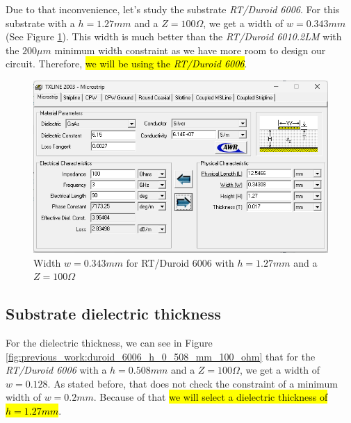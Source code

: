\documentclass[12pt]{report} %
\newcommand{\highlight}[1]{\sethlcolor{yellow}\hl{#1}}
\begin{document}
Due to that inconvenience, let's study the substrate \textit{RT/Duroid 6006}. For this substrate with a $h = 1.27 mm$ and a $Z = 100 \Omega$, we get a width of $w = 0.343 mm$ (See Figure \ref{fig:previous_work:duroid_6006_h_1_27_mm_100_ohm}). This width is much better than the \textit{RT/Duroid 6010.2LM} with the $200 \mu m$ minimum width constraint as we have more room to design our circuit. Therefore, \highlight{we will be using the \textit{RT/Duroid 6006}}.

\begin{figure}[htbp]
    \centering
    \includegraphics[width=\textwidth]{images/previous_work/txline_tool_duroid_6006_h_1_27_mm_100_ohm.png}
    \caption{Width $w = 0.343 mm$ for RT/Duroid 6006 with $h = 1.27 mm$ and a $Z = 100 \Omega$}
    \label{fig:previous_work:duroid_6006_h_1_27_mm_100_ohm}
\end{figure}

\subsection{Substrate dielectric thickness}

For the dielectric thickness, we can see in Figure \ref{fig:previous_work:duroid_6006_h_0_508_mm_100_ohm} that for the \textit{RT/Duroid 6006} with a $h = 0.508 mm$ and a $Z = 100 \Omega$, we get a width of $w = 0.128$. As stated before, that does not check the constraint of a minimum width of $w = 0.2 mm$. Because of that \highlight{we will select a dielectric thickness of $h = 1.27 mm$}.
\end{document}
